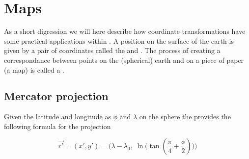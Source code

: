 \chapter{Maps}
\label{maps}

As a short digression we will here describe how coordinate transformations 
have some practical applications within . A position on the surface
of the earth is given by a pair of coordinates called the  and .
The process of creating a correspondance between points on the (spherical) earth and 
on a piece of paper (a map) is called a .

\section{Mercator projection}

Given the latitude and longitude as $\phi$ and $\lambda$ on the sphere
the  provides the following formula for 
the projection

$$
      \vec{r'} = (x',y') = \Big(\lambda-\lambda_0,\; \ln\big(\tan(\frac{\pi}{4}  + \frac{\phi}{2})\big)\Big)
$$


